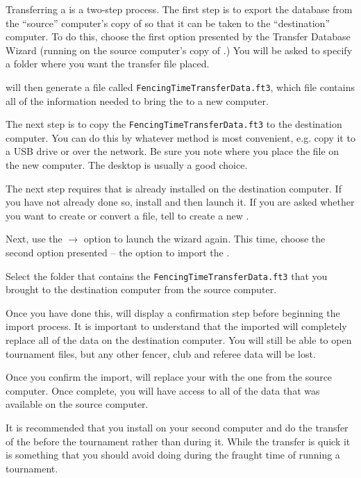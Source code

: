 \documentclass[a4paper,11pt]{memoir}
\begin{document}
Transferring a  is a two-step process. The first step is to export the \gls{database} from the “source” computer’s copy of \fencingtime{} so that it can be taken to the “destination” computer. To do this, choose the first option presented by the Transfer Database Wizard (running on the source computer’s copy of \fencingtime{}.) You will be asked to specify a folder where you want the transfer file placed.

\fencingtime{} will then generate a file called \texttt{FencingTimeTransferData.ft3}, which file contains all of the information needed to bring the  to a new computer.

The next step is to copy the \texttt{FencingTimeTransferData.ft3} to the destination computer. You can do this by whatever method is most convenient, e.g. copy it to a USB drive or over the network. Be sure you note where you place the file on the new computer. The desktop is usually a good choice.

The next step requires that \fencingtime{} is already installed on the destination computer. If you have not already done so, install \fencingtime{} and then launch it. If you are asked whether you want to create or convert a  file, tell \fencingtime{} to create a new . 

Next, use the  $\rightarrow$  option to launch the wizard again. This time, choose the second option presented -- the option to import the .

Select the folder that contains the \texttt{FencingTimeTransferData.ft3} that you brought to the destination computer from the source computer.

Once you have done this, \fencingtime{} will display a confirmation step before beginning the import process. It is important to understand that the imported  will completely replace all of the data on the destination computer. You will still be able to open tournament files, but any other fencer, club and referee data will be lost. 

Once you confirm the import, \fencingtime{} will replace your  with the one from the source computer. Once complete, you will have access to all of the data that was available on the source computer. 

It is recommended that you install \fencingtime{} on your second computer and do the transfer of the  before the tournament rather than during it. While the transfer is quick it is something that you should avoid doing during the fraught time of running a tournament.
\end{document}
